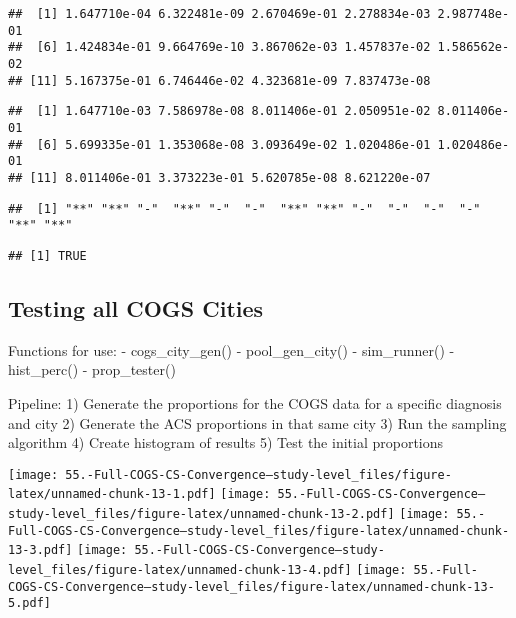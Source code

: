 \documentclass[
]{article}
\begin{document}
\begin{verbatim}
##  [1] 1.647710e-04 6.322481e-09 2.670469e-01 2.278834e-03 2.987748e-01
##  [6] 1.424834e-01 9.664769e-10 3.867062e-03 1.457837e-02 1.586562e-02
## [11] 5.167375e-01 6.746446e-02 4.323681e-09 7.837473e-08
\end{verbatim}

\begin{verbatim}
##  [1] 1.647710e-03 7.586978e-08 8.011406e-01 2.050951e-02 8.011406e-01
##  [6] 5.699335e-01 1.353068e-08 3.093649e-02 1.020486e-01 1.020486e-01
## [11] 8.011406e-01 3.373223e-01 5.620785e-08 8.621220e-07
\end{verbatim}

\begin{verbatim}
##  [1] "**" "**" "-"  "**" "-"  "-"  "**" "**" "-"  "-"  "-"  "-"  "**" "**"
\end{verbatim}

\begin{verbatim}
## [1] TRUE
\end{verbatim}

\hypertarget{testing-all-cogs-cities}{%
\subsection{Testing all COGS Cities}\label{testing-all-cogs-cities}}

Functions for use: - cogs\_city\_gen() - pool\_gen\_city() -
sim\_runner() - hist\_perc() - prop\_tester()

Pipeline: 1) Generate the proportions for the COGS data for a specific
diagnosis and city 2) Generate the ACS proportions in that same city 3)
Run the sampling algorithm 4) Create histogram of results 5) Test the
initial proportions

\texttt{[image: 55.-Full-COGS-CS-Convergence---study-level\_files/figure-latex/unnamed-chunk-13-1.pdf]}
\texttt{[image: 55.-Full-COGS-CS-Convergence---study-level\_files/figure-latex/unnamed-chunk-13-2.pdf]}
\texttt{[image: 55.-Full-COGS-CS-Convergence---study-level\_files/figure-latex/unnamed-chunk-13-3.pdf]}
\texttt{[image: 55.-Full-COGS-CS-Convergence---study-level\_files/figure-latex/unnamed-chunk-13-4.pdf]}
\texttt{[image: 55.-Full-COGS-CS-Convergence---study-level\_files/figure-latex/unnamed-chunk-13-5.pdf]}
\end{document}
